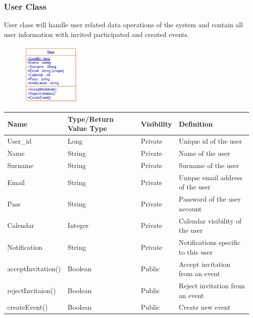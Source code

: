 \subsubsection{User Class}
\par User class will handle user related data operations of the system and contain all user information with invited participated and created events.
\par
\begin{figure}[tbh]
  \begin{center}
  \includegraphics[width=30mm]{userclass}
  \end{center}
\end{figure}
\begin{tabular}{|l|l|l|l|}
  \hline
  \textbf{Name} & \textbf{Type/Return Value Type} & \textbf{Visibility} & \textbf{Definition} \\
  \hline
  User\_id & Long & Private & Unique id of the user \\
  \hline
  Name & String & Private & Name of the user \\
  \hline
  Surname & String & Private & Surname of the user \\
  \hline
  Email & String & Private & Unique email address of the user \\
  \hline
  Pass & String & Private & Password of the user account \\
  \hline
  Calendar & Integer & Private & Calendar visibility of the user \\
  \hline
  Notification & String & Private & Notifications specific to this user \\
  \hline
  acceptInvitation() & Boolean & Public & Accept invitation from an event \\
  \hline
  rejectInvitaion() & Boolean & Public & Reject invitation from an event \\
  \hline
  createEvent() & Boolean & Public & Create new event \\
  \hline
\end{tabular}
